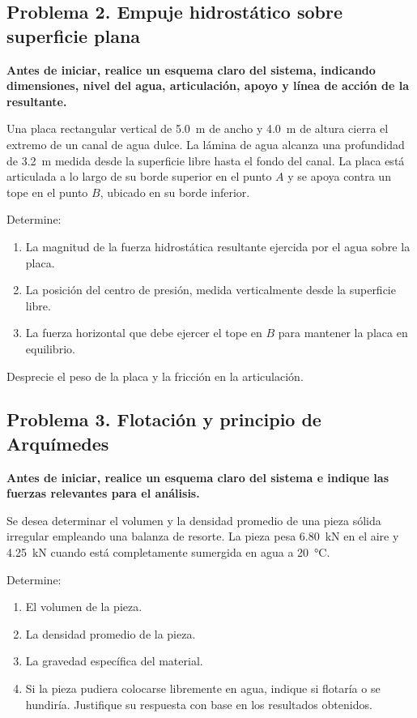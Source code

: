 \documentclass[11pt]{article}
\begin{document}
\subsection*{Problema 2. Empuje hidrostático sobre superficie plana}
\textbf{Antes de iniciar, realice un esquema claro del sistema, indicando dimensiones, nivel del agua, articulación, apoyo y línea de acción de la resultante.}

Una placa rectangular vertical de \SI{5.0}{\meter} de ancho y \SI{4.0}{\meter} de altura cierra el extremo de un canal de agua dulce. La lámina de agua alcanza una profundidad de \SI{3.2}{\meter} medida desde la superficie libre hasta el fondo del canal. La placa está articulada a lo largo de su borde superior en el punto $A$ y se apoya contra un tope en el punto $B$, ubicado en su borde inferior.

Determine:
\begin{enumerate}
\item La magnitud de la fuerza hidrostática resultante ejercida por el agua sobre la placa.
\item La posición del centro de presión, medida verticalmente desde la superficie libre.
\item La fuerza horizontal que debe ejercer el tope en $B$ para mantener la placa en equilibrio.
\end{enumerate}

Desprecie el peso de la placa y la fricción en la articulación.

\subsection*{Problema 3. Flotación y principio de Arquímedes}
\textbf{Antes de iniciar, realice un esquema claro del sistema e indique las fuerzas relevantes para el análisis.}

Se desea determinar el volumen y la densidad promedio de una pieza sólida irregular empleando una balanza de resorte. La pieza pesa \SI{6.80}{\kilo\newton} en el aire y \SI{4.25}{\kilo\newton} cuando está completamente sumergida en agua a \SI{20}{\celsius}.

Determine:
\begin{enumerate}
\item El volumen de la pieza.
\item La densidad promedio de la pieza.
\item La gravedad específica del material.
\item Si la pieza pudiera colocarse libremente en agua, indique si flotaría o se hundiría. Justifique su respuesta con base en los resultados obtenidos.
\end{enumerate}
\end{document}
